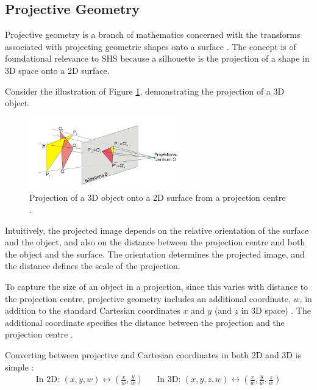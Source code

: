 \subsection{Projective Geometry}

Projective geometry is a branch of mathematics concerned with the transforms associated with projecting geometric shapes onto a surface \cite{artmann_2018}. The concept is of foundational relevance to SHS because a silhouette is the projection of a shape in 3D space onto a 2D surface.

Consider the illustration of Figure \ref{fig:projective_geometry}, demonstrating the projection of a 3D object.

\begin{figure}[ht]
  \centering
  \includegraphics[width=0.6\textwidth]{images/q2_projective_geometry.jpg}
  \caption{Projection of a 3D object onto a 2D surface from a projection centre \cite{baecker_2005}.}
  \label{fig:projective_geometry}
\end{figure}

Intuitively, the projected image depends on the relative orientation of the surface and the object, and also on the distance between the projection centre and both the object and the surface. The orientation determines the projected image, and the distance defines the scale of the projection.

To capture the size of an object in a projection, since this varies with distance to the projection centre, projective geometry includes an additional coordinate, $w$, in addition to the standard Cartesian coordinates $x$ and $y$ (and $z$ in 3D space) \cite{lovell_2023b}. The additional coordinate specifies the distance between the projection and the projection centre \cite{lovell_2023b}.

Converting between projective and Cartesian coordinates in both 2D and 3D is simple \cite{lovell_2023b}:
\begin{align} \label{eqn:proj2cart}
  \text{In 2D: } (x, y, w) \longleftrightarrow \left( \frac{x}{w}, \frac{y}{w} \right) &&
  \text{In 3D: } (x, y, z, w) \longleftrightarrow \left( \frac{x}{w}, \frac{y}{w}, \frac{z}{w} \right)
\end{align}

